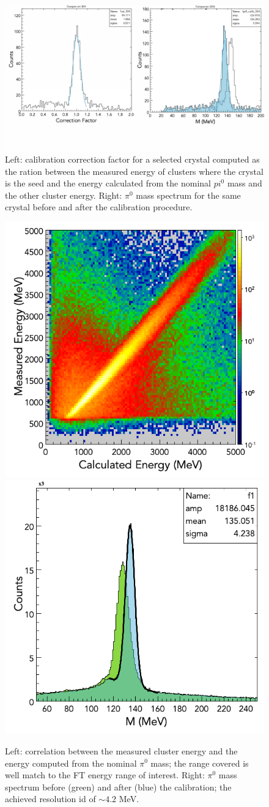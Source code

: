 \begin{figure}
\includegraphics[height=0.46\columnwidth]{fig/ftcal_pi0.pdf}
\caption{Left: calibration correction factor for a selected crystal computed as the ration between the measured energy of clusters where the crystal is the seed and the energy calculated from the nominal $pi^0$ mass and the other cluster energy. Right: $\pi^0$ mass spectrum for the same crystal before and after the calibration procedure.}
\label{fig:ftcal_pi0}
\end{figure}

\begin{figure}
\includegraphics[height=0.48\columnwidth]{fig/ftcal_pi0linearity.png}
\includegraphics[height=0.48\columnwidth]{fig/ftcal_pi0resolution.png}
\caption{Left: correlation between the measured cluster energy and the energy computed from the nominal $\pi^0$ mass; the range covered is well match to the FT energy range of interest. Right: $\pi^0$ mass spectrum before (green) and after (blue) the calibration; the achieved resolution id of $\sim 4.2$ MeV.}
\label{fig:ftcal_pi0res}
\end{figure}

